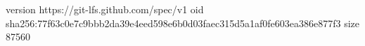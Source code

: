 version https://git-lfs.github.com/spec/v1
oid sha256:77f63c0e7c9bbb2da39e4eed598e6b0d03faec315d5a1af0fe603ea386e877f3
size 87560
